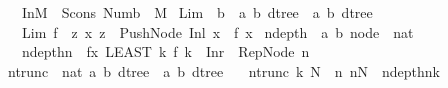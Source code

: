 \begin{isabellebody}
\ \ \ {\isachardoublequoteopen}In{}{\isacharparenleft}M{\isacharparenright}\ {\isacharequal}{\isacharequal}\ Scons\ {\isacharparenleft}Numb\ {}{\isacharparenright}\ M{\isachardoublequoteclose}\isanewline
\isanewline
\isanewline
{}\isamarkupfalse%
\ Lim\ {\isacharcolon}{\isacharcolon}\ {\isachardoublequoteopen}{\isacharparenleft}{\isacharprime}b\ {\isacharequal}{\isachargreater}\ {\isacharparenleft}{\isacharprime}a{\isacharcomma}\ {\isacharprime}b{\isacharparenright}\ dtree{\isacharparenright}\ {\isacharequal}{\isachargreater}\ {\isacharparenleft}{\isacharprime}a{\isacharcomma}\ {\isacharprime}b{\isacharparenright}\ dtree{\isachardoublequoteclose}\isanewline
\ \ \ {\isachardoublequoteopen}Lim\ f\ {\isacharequal}{\isacharequal}\ {\isasymUnion}{\isacharbraceleft}z{\isachardot}\ {\isasymexists}x{\isachardot}\ z\ {\isacharequal}\ Push{\isacharunderscore}Node\ {\isacharparenleft}Inl\ x{\isacharparenright}\ {\isacharbackquote}\ {\isacharparenleft}f\ x{\isacharparenright}{\isacharbraceright}{\isachardoublequoteclose}\isanewline
\isanewline
\isanewline
{}\isamarkupfalse%
\ ndepth\ {\isacharcolon}{\isacharcolon}\ {\isachardoublequoteopen}{\isacharparenleft}{\isacharprime}a{\isacharcomma}\ {\isacharprime}b{\isacharparenright}\ node\ {\isacharequal}{\isachargreater}\ nat{\isachardoublequoteclose}\isanewline
\ \ \ {\isachardoublequoteopen}ndepth{\isacharparenleft}n{\isacharparenright}\ {\isacharequal}{\isacharequal}\ {\isacharparenleft}{\isacharpercent}{\isacharparenleft}f{\isacharcomma}x{\isacharparenright}{\isachardot}\ LEAST\ k{\isachardot}\ f\ k\ {\isacharequal}\ Inr\ {}{\isacharparenright}\ {\isacharparenleft}Rep{\isacharunderscore}Node\ n{\isacharparenright}{\isachardoublequoteclose}\isanewline
{}\isamarkupfalse%
\ ntrunc\ {\isacharcolon}{\isacharcolon}\ {\isachardoublequoteopen}{\isacharbrackleft}nat{\isacharcomma}\ {\isacharparenleft}{\isacharprime}a{\isacharcomma}\ {\isacharprime}b{\isacharparenright}\ dtree{\isacharbrackright}\ {\isacharequal}{\isachargreater}\ {\isacharparenleft}{\isacharprime}a{\isacharcomma}\ {\isacharprime}b{\isacharparenright}\ dtree{\isachardoublequoteclose}\isanewline
\ \ \ {\isachardoublequoteopen}ntrunc\ k\ N\ {\isacharequal}{\isacharequal}\ {\isacharbraceleft}n{\isachardot}\ n{\isasymin}N\ {\isasymand}\ ndepth{\isacharparenleft}n{\isacharparenright}{\isacharless}k{\isacharbraceright}{\isachardoublequoteclose}\isanewline
\isanewline
\isanewline
{}\isamarkupfalse%

\end{isabellebody}
